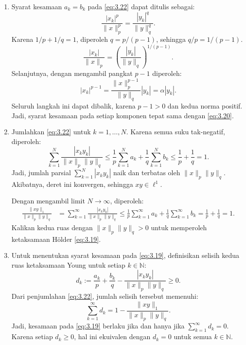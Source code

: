 \documentclass[aspectratio=169,11pt]{beamer}
\theoremstyle{definition}
\newcommand{\N}{\mathbb{N}}
\begin{document}
\begin{frame}[allowframebreaks=1]{\insertsection}{\insertsubsection}
\begin{enumerate}
    \item Syarat kesamaan $a_k=b_k$ pada \eqref{eq:3.22} dapat ditulis sebagai:
          \begin{equation}
            \frac{|x_k|^p}{\|x\|_p^p}=\frac{|y_k|^q}{\|y\|_q^q}. \label{eq:3.23}
          \end{equation}
          Karena $1/p+1/q=1$, diperoleh $q=p/(p-1)$, sehingga $q/p=1/(p-1)$.
          \begin{equation}
            \frac{|x_k|}{\|x\|_p}
            =\left(\frac{|y_k|}{\|y\|_q}\right)^{1/(p-1)}. \label{eq:3.24}
          \end{equation}
          Selanjutnya, dengan mengambil pangkat $p-1$ diperoleh:
          \begin{equation*}
            |x_k|^{p-1}=\frac{\|x\|_p^{p-1}}{\|y\|_q}|y_k|=\alpha|y_k|.
          \end{equation*}
          Seluruh langkah ini dapat dibalik, karena $p-1>0$ dan kedua norma positif. Jadi, syarat kesamaan pada setiap komponen tepat sama dengan \eqref{eq:3.20}.


    \item Jumlahkan \eqref{eq:3.22} untuk $k=1,\dots,N$. Karena semua suku tak-negatif, diperoleh:
          \begin{equation*}
            \sum_{k=1}^{N}\frac{|x_k y_k|}{\|x\|_p\|y\|_q}
            \leq \frac{1}{p}\sum_{k=1}^{N}a_k+\frac{1}{q}\sum_{k=1}^{N}b_k
            \leq \frac{1}{p}+\frac{1}{q}=1.
          \end{equation*}
          Jadi, jumlah parsial $\sum_{k=1}^{N}|x_k y_k|$ naik dan terbatas oleh $\|x\|_p\|y\|_q$. Akibatnya, deret ini konvergen, sehingga $xy\in\ell^1$.

          Dengan mengambil limit $N\to\infty$, diperoleh:
          \begin{align*}
            \frac{\|xy\|_1}{\|x\|_p\|y\|_q}
             & =\sum_{k=1}^{\infty}\frac{|x_k y_k|}{\|x\|_p\|y\|_q} \leq \frac{1}{p}\sum_{k=1}^{\infty}a_k
            +\frac{1}{q}\sum_{k=1}^{\infty}b_k
            =\frac{1}{p}+\frac{1}{q}=1.
          \end{align*}
          Kalikan kedua ruas dengan $\|x\|_p\|y\|_q>0$ untuk memperoleh ketaksamaan H\"older \eqref{eq:3.19}.


    \item Untuk menentukan syarat kesamaan pada \eqref{eq:3.19}, definisikan selisih kedua ruas ketaksamaan Young untuk setiap $k\in\N$:
          \begin{equation*}
            d_k:=\frac{a_k}{p}+\frac{b_k}{q}
            -\frac{|x_k y_k|}{\|x\|_p\|y\|_q}\geq 0.
          \end{equation*}
          Dari penjumlahan \eqref{eq:3.22}, jumlah selisih tersebut memenuhi:
          \begin{equation*}
            \sum_{k=1}^{\infty}d_k
            =1-\frac{\|xy\|_1}{\|x\|_p\|y\|_q}.
          \end{equation*}
          Jadi, kesamaan pada \eqref{eq:3.19} berlaku jika dan hanya jika $\sum_{k=1}^{\infty}d_k=0$. Karena setiap $d_k\geq 0$, hal ini ekuivalen dengan $d_k=0$ untuk semua $k\in\N$.


\end{enumerate}
\end{frame}
\end{document}
